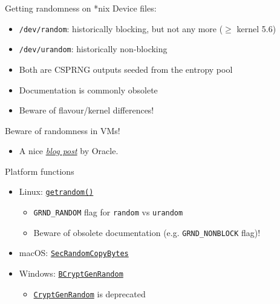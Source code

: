 \begin{frame}{Getting randomness on *nix}
  \pause
  Device files:
  \begin{itemize}
    \item \texttt{/dev/random}: historically blocking, but not any more ($\ge$ kernel 5.6)
    \item \texttt{/dev/urandom}: historically non-blocking
    \pause
    \item Both are CSPRNG outputs seeded from the entropy pool
    \pause
    \item Documentation is commonly obsolete
    \pause
    \item Beware of flavour/kernel differences!
  \end{itemize}

  \vspace*{1em}
  
  \pause
  Beware of randomness in VMs!
  \begin{itemize}
    \item A nice \href{https://blogs.oracle.com/linux/post/rngd1}{\emph{blog post}} by Oracle.
  \end{itemize}
\end{frame}

\begin{frame}{Platform functions}
  \begin{itemize}
    \item Linux: \href{https://man7.org/linux/man-pages/man2/getrandom.2.html}{\texttt{getrandom()}}
    \begin{itemize}
      \item \texttt{GRND\_RANDOM} flag for \texttt{random} vs \texttt{urandom}
      \item Beware of obsolete documentation (e.g. \texttt{GRND\_NONBLOCK} flag)!
    \end{itemize}
    \vspace*{1em}
    \item macOS: \href{https://developer.apple.com/documentation/security/secrandomcopybytes(_:_:_:)}{\texttt{SecRandomCopyBytes}}
    \vspace*{1em}
    \item Windows: \href{https://learn.microsoft.com/en-us/windows/win32/api/bcrypt/nf-bcrypt-bcryptgenrandom}{\texttt{BCryptGenRandom}}
    \begin{itemize}
      \item \href{https://learn.microsoft.com/en-us/windows/win32/api/wincrypt/nf-wincrypt-cryptgenrandom}{\texttt{CryptGenRandom}} is deprecated
    \end{itemize}
  \end{itemize}
\end{frame}

